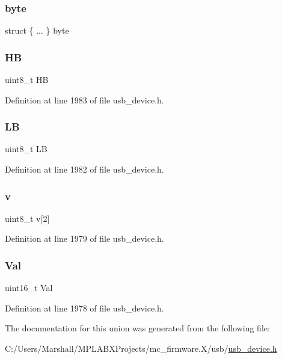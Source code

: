 \subsubsection{\texorpdfstring{byte}{byte}}
{\footnotesize\ttfamily struct \{ ... \}   byte}

\mbox{\label{unionuint16__t___v_a_l_ad741fe9900e35379cedd1deefa7ba84f}} 
\subsubsection{\texorpdfstring{HB}{HB}}
{\footnotesize\ttfamily uint8\+\_\+t HB}



Definition at line 1983 of file usb\+\_\+device.\+h.

\mbox{\label{unionuint16__t___v_a_l_aecc66fcbbc95a34cfd23bddac11a425d}} 
\subsubsection{\texorpdfstring{LB}{LB}}
{\footnotesize\ttfamily uint8\+\_\+t LB}



Definition at line 1982 of file usb\+\_\+device.\+h.

\mbox{\label{unionuint16__t___v_a_l_a81a08957904c562944b33d7d2ae4f42d}} 
\subsubsection{\texorpdfstring{v}{v}}
{\footnotesize\ttfamily uint8\+\_\+t v\mbox{[}2\mbox{]}}



Definition at line 1979 of file usb\+\_\+device.\+h.

\mbox{\label{unionuint16__t___v_a_l_ac5c61e3f936b9c3554b06beb5961c12e}} 
\subsubsection{\texorpdfstring{Val}{Val}}
{\footnotesize\ttfamily uint16\+\_\+t Val}



Definition at line 1978 of file usb\+\_\+device.\+h.



The documentation for this union was generated from the following file\+:\begin{DoxyCompactItemize}
\item 
C\+:/\+Users/\+Marshall/\+M\+P\+L\+A\+B\+X\+Projects/mc\+\_\+firmware.\+X/usb/\mbox{\hyperlink{usb__device_8h}{usb\+\_\+device.\+h}}\end{DoxyCompactItemize}
